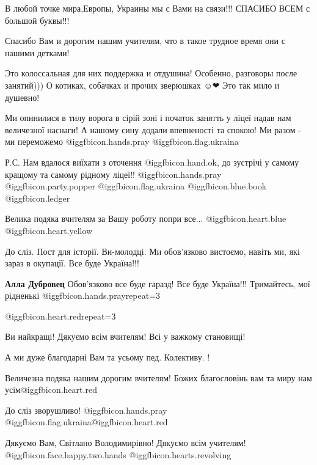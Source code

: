 \begin{itemize}
В любой точке мира,Европы,
Украины мы с Вами на связи!!!
СПАСИБО ВСЕМ с большой буквы!!!


Спасибо Вам и дорогим нашим учителям, что в такое трудное время они с нашими детками!

Это колоссальная для них поддержка и отдушина! Особенно, разговоры после
занятий))) О котиках, собачках и прочих зверюшках ☺❤ Это так мило и душевно!


Ми опинилися в тилу ворога в сірій зоні і початок занятть у ліцеї надав нам
величезної наснаги! А нашому сину додали впевненості та спокою! Ми разом - ми
переможемо @igg{fbicon.hands.pray}  @igg{fbicon.flag.ukraina}

Р.С. Нам вдалося виїхати з оточення @igg{fbicon.hand.ok}, до зустрічі у самому
кращому та самому рідному ліцеї!! @igg{fbicon.hands.pray}
@igg{fbicon.party.popper} @igg{fbicon.flag.ukraina}  @igg{fbicon.blue.book}  @igg{fbicon.ledger} 

Велика подяка вчителям за Вашу роботу попри все... @igg{fbicon.heart.blue}  @igg{fbicon.heart.yellow} 

До сліз. Пост для історії. Ви-молодці. Ми обов'язково вистоємо, навіть ми, які
зараз в окупації. Все буде Україна!!!

\textbf{Алла Дубровец} Обов’язково все буде гаразд! Все буде Україна!!! Тримайтесь, мої рідненькі @igg{fbicon.hands.pray}{repeat=3} 

@igg{fbicon.heart.red}{repeat=3}

Ви найкращі! Дякуємо всім вчителям! Всі у важкому становищі!

А ми дуже благодарні Вам та усьому пед. Колективу. !

Величезна подяка нашим дорогим вчителям! Божих благословінь вам та миру нам усім@igg{fbicon.heart.red}

До сліз зворушливо! @igg{fbicon.hands.pray} @igg{fbicon.flag.ukraina}@igg{fbicon.heart.red}


Дякуємо Вам, Світлано Володимирівно! Дякуємо всім учителям!
@igg{fbicon.face.happy.two.hands}  @igg{fbicon.hearts.revolving} 



\end{itemize}
